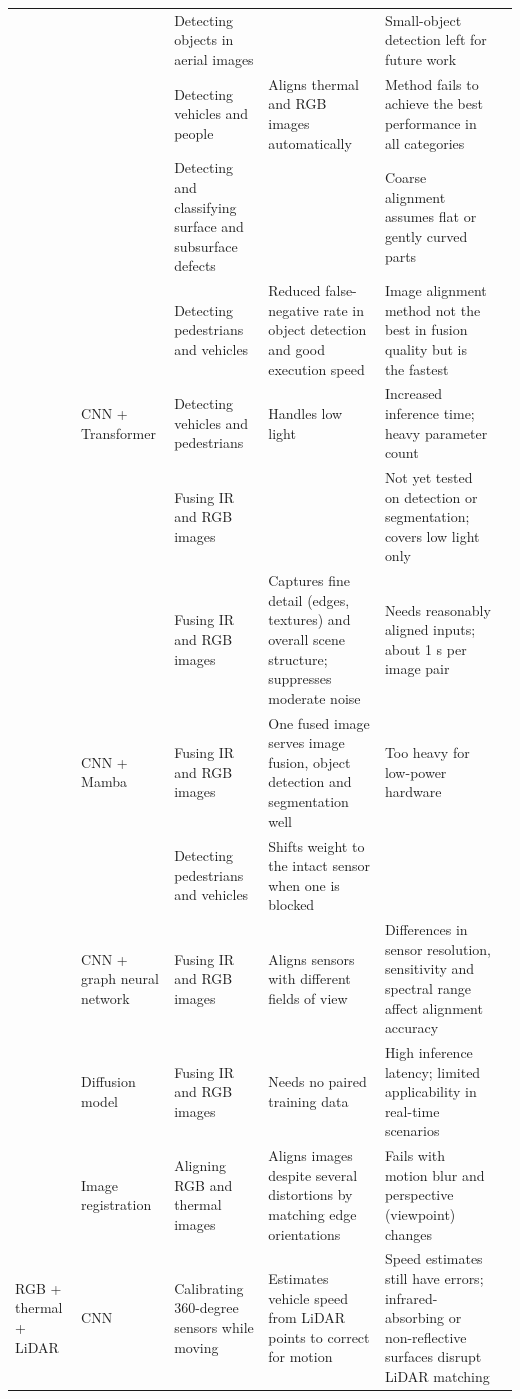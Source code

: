 {\begin{xltabular}{\textwidth}{>{\RaggedRight\arraybackslash}p{1.6cm}>{\RaggedRight\arraybackslash}p{2.2cm}>{\RaggedRight\arraybackslash}p{2.3cm}>{\RaggedRight\arraybackslash}X>{\RaggedRight\arraybackslash}Xp{0.95cm}}
 &  & Detecting objects in aerial images &  & Small-object detection left for future work & \citep{Liu2025a} \\
 &  & Detecting vehicles and people & Aligns thermal and RGB images automatically & Method fails to achieve the best performance in all categories & \citep{Liu2025} \\
 &  & Detecting and classifying surface and subsurface defects &  & Coarse alignment assumes flat or gently curved parts & \citep{Li2024c} \\
 &  & Detecting pedestrians and vehicles & Reduced false-negative rate in object detection and good execution speed & Image alignment method not the best in fusion quality but is the fastest & \citep{Lin2022} \\
 & CNN + Transformer & Detecting vehicles and pedestrians & Handles low light & Increased inference time; heavy parameter count & \citep{Jiang2024} \\
 &  & Fusing IR and RGB images &  & Not yet tested on detection or segmentation; covers low light only & \citep{An2026} \\
 &  & Fusing IR and RGB images & Captures fine detail (edges, textures) and overall scene structure; suppresses moderate noise & Needs reasonably aligned inputs; about 1 s per image pair & \citep{Xu2026} \\
 & CNN + Mamba & Fusing IR and RGB images & One fused image serves image fusion, object detection and segmentation well & Too heavy for low-power hardware & \citep{Chen2026a} \\
 &  & Detecting pedestrians and vehicles & Shifts weight to the intact sensor when one is blocked &  & \citep{Wang2026b} \\
 & CNN + graph neural network & Fusing IR and RGB images & Aligns sensors with different fields of view & Differences in sensor resolution, sensitivity and spectral range affect alignment accuracy & \citep{Shahsavarani2024} \\
 & Diffusion model & Fusing IR and RGB images & Needs no paired training data & High inference latency; limited applicability in real-time scenarios & \citep{Zhou2026} \\
 & Image registration & Aligning RGB and thermal images & Aligns images despite several distortions by matching edge orientations & Fails with motion blur and perspective (viewpoint) changes & \citep{Bin2023} \\
\midrule
RGB + thermal + LiDAR & CNN & Calibrating 360-degree sensors while moving & Estimates vehicle speed from LiDAR points to correct for motion & Speed estimates still have errors; infrared-absorbing or non-reflective surfaces disrupt LiDAR matching & \citep{Tran2024} \\

\end{xltabular}}
